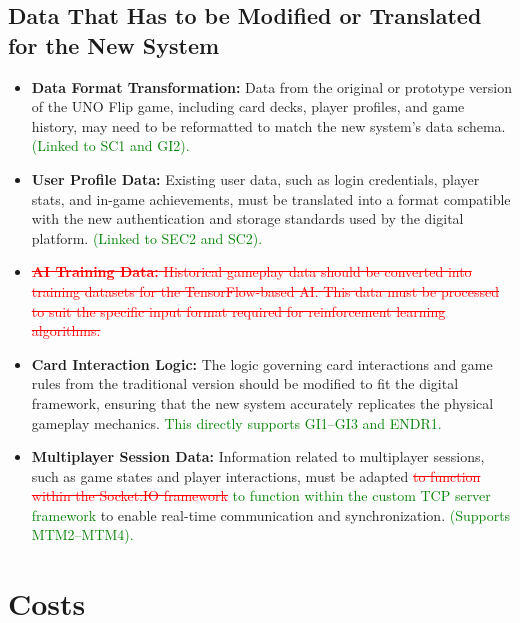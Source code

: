 \documentclass[12pt]{article}
\newcommand{\removed}[1]{\textcolor{red}{\sout{#1}}}
\newcommand{\added}[1]{\textcolor{green}{#1}}
\begin{document}
\subsection{Data That Has to be Modified or Translated for the New System}
\begin{itemize}
    \item \textbf{Data Format Transformation:} Data from the original or prototype version of the UNO Flip game, including card decks, player profiles, and game history, may need to be reformatted to match the new system's data schema. \added{(Linked to SC1 and GI2).}
    
    \item \textbf{User Profile Data:} Existing user data, such as login credentials, player stats, and in-game achievements, must be translated into a format compatible with the new authentication and storage standards used by the digital platform. \added{(Linked to SEC2 and SC2).}
    
    \item \removed{\textbf{AI Training Data:} Historical gameplay data should be converted into training datasets for the TensorFlow-based AI. This data must be processed to suit the specific input format required for reinforcement learning algorithms.}
    
    \item \textbf{Card Interaction Logic:} The logic governing card interactions and game rules from the traditional version should be modified to fit the digital framework, ensuring that the new system accurately replicates the physical gameplay mechanics. \added{This directly supports GI1–GI3 and ENDR1.}
    
    \item \textbf{Multiplayer Session Data:} Information related to multiplayer sessions, such as game states and player interactions, must be adapted \removed{to function within the Socket.IO framework} \added{to function within the custom TCP server framework} to enable real-time communication and synchronization. \added{(Supports MTM2–MTM4).}
\end{itemize}

\section{Costs}
\end{document}
